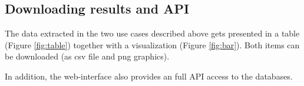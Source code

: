 \subsection{Downloading results and API}

The data extracted in the two use cases described above gets presented in a table (Figure \ref{fig:table}) together with a visualization (Figure \ref{fig:bar}). Both items can be downloaded (as csv file and png graphics).

In addition, the web-interface also provides an full API access to the databases. 
